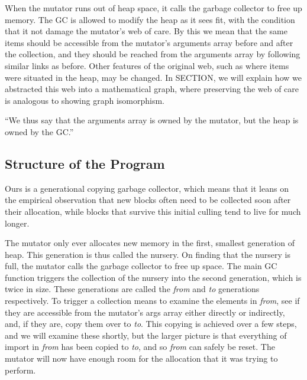 When the mutator runs out of heap space, 
it calls the garbage collector to free up memory. 
The GC is allowed to modify the heap as
it sees fit, with the condition that it not damage the 
mutator's web of care. By this we mean that the same items 
should be accessible from the mutator's arguments
array before and after the collection, and they 
should be reached from the arguments array by 
following similar links as before. 
Other features of the original web, such as where 
items were situated in the heap, may be changed. 
In SECTION, we will explain how we abstracted this
web into a mathematical graph, where preserving the 
web of care is analogous to showing graph isomorphism.

``We thus say that the arguments array is owned by the 
mutator, but the heap is owned by the GC.''

\subsection{Structure of the Program}
\label{sec:gcstructure}
Ours is a generational copying garbage collector, which
means that it leans on the empirical observation that
new blocks often need to be collected soon after their
allocation, while blocks that survive this initial
culling tend to live for much longer.

The mutator only ever allocates new memory in the first, 
smallest generation of heap. This generation is thus 
called the nursery. On finding that the nursery is full, 
the mutator calls the garbage collector to free up space.
The main GC function triggers the collection of the nursery
into the second generation, which is twice in size. These generations
are called the \emph{from} and \emph{to} generations respectively.
To trigger a collection means to examine the elements 
in \emph{from}, see if they are accessible from the mutator's
args array either directly or indirectly, and, if they are, 
copy them over to \emph{to}. This copying is achieved over a few steps, 
and we will examine these shortly, but the larger picture is that 
everything of import in \emph{from} has been copied to \emph{to}, 
and so \emph{from} can safely be reset. The mutator will now have 
enough room for the allocation that it was trying to perform.

